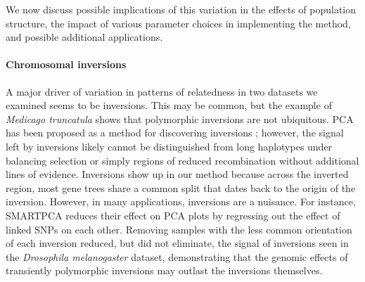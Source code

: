 \documentclass[11pt, oneside]{article}   	%
\newcommand\citep{\cite}
\renewcommand{\llabel}[1]{\relax}
\begin{document}
We now discuss possible implications of this variation in the effects of population structure,
the impact of various parameter choices in implementing the method,
and possible additional applications.


\paragraph{Chromosomal inversions}
A major driver of variation in patterns of relatedness in two datasets we examined seems to be inversions.
This may be common,
but the example of \textit{Medicago truncatula} shows that polymorphic inversions are not ubiquitous.
PCA has been proposed as a method for discovering inversions \citep{ma2012investigation};
however, the signal left by inversions likely cannot be distinguished from long haplotypes under balancing selection 
or simply regions of reduced recombination
without additional lines of evidence.  \llabel{ll:inversion_caveat}
Inversions show up in our method because across the inverted region,
most gene trees share a common split that dates back to the origin of the inversion.
However, in many applications, inversions are a nuisance.
For instance, SMARTPCA \citep{patterson2006population} reduces their effect on PCA plots
by regressing out the effect of linked SNPs on each other.
Removing samples with the less common orientation of each inversion reduced,
but did not eliminate, the signal of inversions
seen in the \textit{Drosophila melanogaster} dataset,
demonstrating that the genomic effects of transiently polymorphic inversions
may outlast the inversions themselves.
\end{document}
